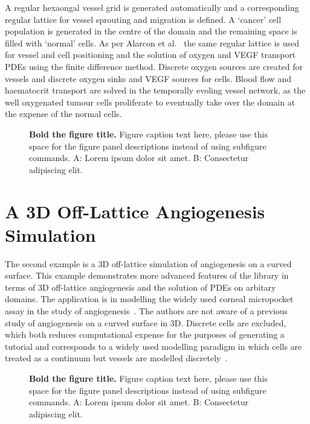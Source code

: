 \documentclass[10pt,letterpaper]{article}
\begin{document}
A regular hexaongal vessel grid is generated automatically and a corresponding regular lattice for vessel sprouting and migration is defined. A `cancer' cell population is generated in the centre of the domain and the remaining space is filled with `normal' cells. As per Alarcon et al.~\cite{Alarcon2005} the same regular lattice is used for vessel and cell positioning and the solution of oxygen and VEGF transport PDEs using the finite difference method. Discrete oxygen sources are created for vessels and discrete oxygen sinks and VEGF sources for cells. Blood flow and haematocrit transport are solved in the temporally evoling vessel network, as the well oxygenated tumour cells proliferate to eventually take over the domain at the expense of the normal cells.

\begin{figure}[!h]
\caption{{\bf Bold the figure title.}
Figure caption text here, please use this space for the figure panel descriptions instead of using subfigure commands. A: Lorem ipsum dolor sit amet. B: Consectetur adipiscing elit.}
\label{fig3}
\end{figure}

\section*{A 3D Off-Lattice Angiogenesis Simulation}

The second example is a 3D off-lattice simulation of angiogenesis on a curved surface. This example demonstrates more advanced features of the library in terms of 3D off-lattice angiogenesis and the solution of PDEs on arbitary domains. The application is in modelling the widely used corneal micropocket assay in the study of angiogenesis~\cite{Connor2015}. The authors are not aware of a previous study of angiogenesis on a curved surface in 3D. Discrete cells are excluded, which both reduces computational expense for the purposes of generating a tutorial and corresponds to a widely used modelling paradigm in which cells are treated as a continuum but vessels are modelled discretely~\cite{Secomb2013}.

\begin{figure}[!h]
\caption{{\bf Bold the figure title.}
Figure caption text here, please use this space for the figure panel descriptions instead of using subfigure commands. A: Lorem ipsum dolor sit amet. B: Consectetur adipiscing elit.}
\label{fig4}
\end{figure}
\end{document}
